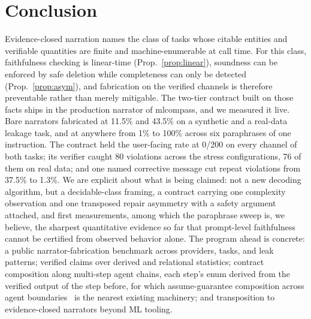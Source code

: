 \documentclass[conference]{IEEEtran}
\begin{document}
\section{Conclusion}
Evidence-closed narration names the class of tasks whose citable entities and verifiable quantities are finite and machine-enumerable at call time. For this class, faithfulness checking is linear-time (Prop.~\ref{prop:linear}), soundness can be enforced by safe deletion while completeness can only be detected (Prop.~\ref{prop:asym}), and fabrication on the verified channels is therefore preventable rather than merely mitigable. The two-tier contract built on those facts ships in the production narrator of mlcompass, and we measured it live. Bare narrators fabricated at 11.5\% and 43.5\% on a synthetic and a real-data leakage task, and at anywhere from 1\% to 100\% across six paraphrases of one instruction. The contract held the user-facing rate at 0/200 on every channel of both tasks; its verifier caught 80 violations across the stress configurations, 76 of them on real data; and one named corrective message cut repeat violations from 37.5\% to 1.3\%. We are explicit about what is being claimed: not a new decoding algorithm, but a decidable-class framing, a contract carrying one complexity observation and one transposed repair asymmetry with a safety argument attached, and first measurements, among which the paraphrase sweep is, we believe, the sharpest quantitative evidence so far that prompt-level faithfulness cannot be certified from observed behavior alone. The program ahead is concrete: a public narrator-fabrication benchmark across providers, tasks, and leak patterns; verified claims over derived and relational statistics; contract composition along multi-step agent chains, each step's enum derived from the verified output of the step before, for which assume-guarantee composition across agent boundaries~\cite{zheng2026continuity} is the nearest existing machinery; and transposition to evidence-closed narrators beyond ML tooling.
\end{document}
